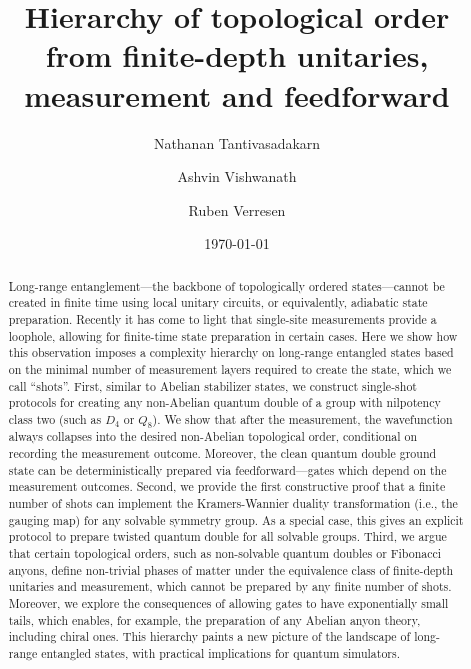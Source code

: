 \documentclass[nofootinbib,prx,twocolumn,showpacs,superscriptaddress,notitlepage,amsmath,amssymb]{revtex4-2}
\theoremstyle{definition}
\begin{document}
\title{Hierarchy of topological order\\
from finite-depth unitaries, measurement and feedforward}


\author{Nathanan Tantivasadakarn}

\author{Ashvin Vishwanath}

\author{Ruben Verresen}

\date{\today}

\begin{abstract}
Long-range entanglement---the backbone of topologically ordered states---cannot be created in finite time using local unitary circuits, or equivalently, adiabatic state preparation. Recently it has come to light that single-site measurements provide a loophole, allowing for finite-time state preparation in certain cases. Here we show how this observation imposes a complexity hierarchy on long-range entangled states based on the minimal number of measurement layers required to create the state, which we call ``shots''. First, similar to Abelian stabilizer states, we construct single-shot protocols for creating any non-Abelian quantum double of a group with nilpotency class two (such as $D_4$ or $Q_8$). We show that after the measurement, the wavefunction always collapses into the desired non-Abelian topological order, conditional on recording the measurement outcome. Moreover, the clean quantum double ground state can be deterministically prepared via feedforward---gates which depend on the measurement outcomes. Second, we provide the first constructive proof that a finite number of shots can implement the Kramers-Wannier duality transformation (i.e., the gauging map) for any solvable symmetry group. As a special case, this gives an explicit protocol to prepare twisted quantum double for all solvable groups. Third, we argue that certain topological orders, such as non-solvable quantum doubles or Fibonacci anyons, define non-trivial phases of matter under the equivalence class of finite-depth unitaries and measurement, which cannot be prepared by any finite number of shots. Moreover, we explore the consequences of allowing gates to have exponentially small tails, which enables, for example, the preparation of any Abelian anyon theory, including chiral ones. This hierarchy paints a new picture of the landscape of long-range entangled states, with practical implications for quantum simulators.
\end{abstract}
\end{document}
